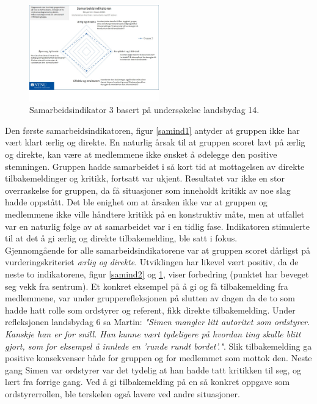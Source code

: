 \begin{figure}[h!]
  \centering
    \includegraphics[width=0.5\textwidth]{Bilder/samarbeidsindikator_3.jpg}
    \caption{Samarbeidsindikator 3 basert på undersøkelse landsbydag 14.}
    \label{samind3}
\end{figure}

Den første samarbeidsindikatoren, figur \ref{samind1} antyder at gruppen ikke har vært klart ærlig og direkte.
En naturlig årsak til at gruppen scoret lavt på ærlig og direkte, kan være at medlemmene ikke ønsket å ødelegge den positive stemningen. Gruppen hadde samarbeidet i så kort tid at mottagelsen av direkte tilbakemeldinger og kritikk, fortsatt var ukjent. Resultatet var ikke en stor overraskelse for gruppen, da få situasjoner som inneholdt kritikk av noe slag hadde oppstått. Det ble enighet om at årsaken ikke var at gruppen og medlemmene ikke ville håndtere kritikk på en konstruktiv måte, men at utfallet var en naturlig følge av at samarbeidet var i en tidlig fase. Indikatoren stimulerte til at det å gi ærlig og direkte tilbakemelding, ble satt i fokus. \\

Gjennomgående for alle samarbeidsindikatorene var at gruppen scoret dårligst på vurderingskriteriet \textit{ærlig og direkte}. 
Utviklingen har likevel vært positiv, da de neste to indikatorene, figur \ref{samind2} og \ref{samind3}, viser forbedring (punktet har beveget seg vekk fra sentrum). 
Et konkret eksempel på å gi og få tilbakemelding fra medlemmene, var under grupperefleksjonen på slutten av dagen da de to som hadde hatt rolle som ordstyrer og referent, fikk direkte tilbakemelding. Under refleksjonen landsbydag 6 sa Martin: \textit{"Simen mangler litt autoritet som ordstyrer. Kanskje han er for snill. Han kunne vært tydeligere på hvordan ting skulle blitt gjort, som for eksempel å innlede en 'runde rundt bordet'."}. Slik tilbakemelding ga positive konsekvenser både for gruppen og for medlemmet som mottok den. Neste gang Simen var ordstyrer var det tydelig at han hadde tatt kritikken til seg, og lært fra forrige gang.
Ved å gi tilbakemelding på en så konkret oppgave som ordstyrerrollen, ble terskelen også lavere ved andre situasjoner. \\

